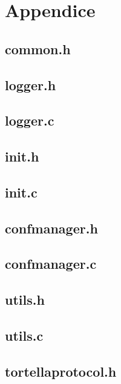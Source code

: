 \chapter{Appendice}\label{appendice}
\section{common.h}

\pagebreak
\section{logger.h}

\pagebreak
\section{logger.c}

\pagebreak
\section{init.h}

\pagebreak
\section{init.c}

\pagebreak
\section{confmanager.h}

\pagebreak
\section{confmanager.c}

\pagebreak
\section{utils.h}

\pagebreak
\section{utils.c}

\pagebreak
\section{tortellaprotocol.h}

\pagebreak
